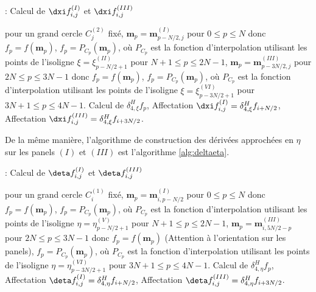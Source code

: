 \begin{center}
\begin{minipage}[H]{12cm}
  \begin{algorithm}[H]
    \caption{: Calcul de $\dxi f_{i, j}^{(I)}$ et $\dxi f_{i, j}^{(III)}$}\label{alg:deltaxi}
    \begin{algorithmic}[1]
    \State pour un grand cercle $C_j^{(2)}$ fixé,
             \State  $\mathbf{m}_p = \mathbf{m}_{p-N/2,j}^{(I)}$ pour $0  \leq p \leq N$ donc $f_p = f(\mathbf{m}_p)$,
             \State $f_p = P_{C_p}(\mathbf{m}_p)$, où $P_{C_p}$ est la fonction d'interpolation utilisant les points de l'isoligne $\xi = \xi^{(II)}_{p-N/2+1}$ pour $N+1 \leq p \leq 2N-1$,
             \State  $\mathbf{m}_p = \mathbf{m}_{p-3N/2,j}^{(III)}$ pour $2N  \leq p \leq 3N-1$ donc $f_p = f(\mathbf{m}_p)$,
             \State $f_p = P_{C_p}(\mathbf{m}_p)$, où $P_{C_p}$ est la fonction d'interpolation utilisant les points de l'isoligne $\xi = \xi^{(VI)}_{p-3N/2+1}$ pour $3N+1 \leq p \leq 4N-1$.
            \EndFor
    \State Calcul de $\delta_{4, \xi}^H f_p$,
    \State Affectation $\dxi f_{i,j}^{(I)} = \delta_{4, \xi}^H f_{i+N/2}$,
    \State Affectation $\dxi f_{i,j}^{(III)} = \delta_{4, \xi}^H f_{i+3N/2}$.
    \EndFor
    \end{algorithmic}
    \end{algorithm}
\end{minipage}
\end{center}
De la même manière, l'algorithme de construction des dérivées approchées en $\eta$ sur les panels $(I)$ et $(III)$ est l'algorithme \ref{alg:deltaeta}.
\begin{center}
\begin{minipage}[H]{12cm}
  \begin{algorithm}[H]
    \caption{: Calcul de $\deta f_{i, j}^{(I)}$ et $\deta f_{i, j}^{(III)}$}\label{alg:deltaeta}
    \begin{algorithmic}[1]
    \State pour un grand cercle $C_i^{(1)}$ fixé,
             \State  $\mathbf{m}_p = \mathbf{m}_{i,p-N/2}^{(I)}$ pour $0  \leq p \leq N$ donc $f_p = f(\mathbf{m}_p)$,
             \State $f_p = P_{C_p}(\mathbf{m}_p)$, où $P_{C_p}$ est la fonction d'interpolation utilisant les points de l'isoligne $\eta = \eta^{(V)}_{p-N/2+1}$ pour $N+1 \leq p \leq 2N-1$,
             \State  $\mathbf{m}_p = \mathbf{m}_{i,5N/2-p}^{(III)}$ pour $2N  \leq p \leq 3N-1$ donc $f_p = f(\mathbf{m}_p)$ (Attention à l'orientation sur les panels),
             \State $f_p = P_{C_p}(\mathbf{m}_p)$, où $P_{C_p}$ est la fonction d'interpolation utilisant les points de l'isoligne $\eta = \eta^{(VI)}_{p-3N/2+1}$ pour $3N+1 \leq p \leq 4N-1$.
            \EndFor
    \State Calcul de $\delta_{4, \eta}^H f_p$,
    \State Affectation $\deta f_{i,j}^{(I)} = \delta_{4, \eta}^H f_{i+N/2}$,
    \State Affectation $\deta f_{i,j}^{(III)} = \delta_{4, \eta}^H f_{i+3N/2}$.
    \EndFor
    \end{algorithmic}
    \end{algorithm}
\end{minipage}
\end{center}

